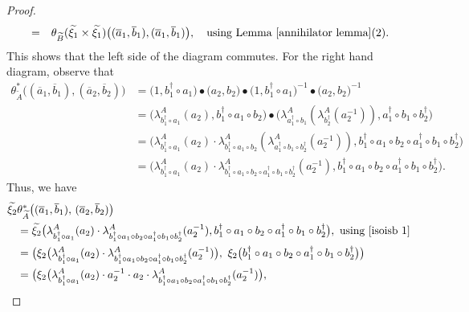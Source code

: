 \documentclass{jonasart}
\theoremstyle{plain}
\begin{document}
\begin{proof}
\begin{eqnarray*}
			&=&\theta_{\widetilde{B}}(\widetilde{\xi_1}\times\widetilde{\xi_1})\big((\overline{a}_1,\overline{b}_1 ),(\overline{a}_1,\overline{b}_1 )\big), \quad \text{using Lemma~\eqref{annihilator lemma}(2)}.
		\end{eqnarray*}
		This shows that the left side of the diagram commutes. For the right hand diagram, observe that
		\begin{align}
			\theta^*_{\widetilde{A}} \big((\overline{a}_1,\overline{b}_1 ), (\overline{a}_2,\overline{b}_2 ) \big)&= \big(1,b_1^\dagger\circ a_1\big) \bullet \big(a_2,b_2\big) \bullet\big(1,b_1^\dagger\circ a_1 \big)^{-1} \bullet \big(a_2,b_2 \big)^{-1}\nonumber\\
			&= \big(\lambda^A_{b_1^\dagger\circ a_1}(a_2 ), b_1^\dagger\circ a_1\circ b_2 \big) \bullet \big(\lambda^A_{a_1^\dagger\circ b_1}(\lambda^A_{b_2^\dagger}(a_2^{-1})), a_1^\dagger\circ b_1\circ b_2^\dagger \big)\nonumber\\
			&= \big(\lambda^A_{b_1^\dagger\circ a_1}(a_2 ) \cdot \lambda^A_{b_1^\dagger\circ a_1\circ b_2}(\lambda^A_{a_1^\dagger\circ b_1\circ b_2^\dagger}(a_2^{-1})), b_1^\dagger\circ a_1\circ b_2\circ a_1^\dagger\circ b_1 \circ b_2^\dagger \big)\nonumber\\
			&= \big(\lambda^A_{b_1^\dagger\circ a_1}(a_2 ) \cdot \lambda^A_{b_1^\dagger\circ a_1\circ b_2\circ a_1^\dagger\circ b_1 \circ b_2^\dagger}(a_2^{-1}), b_1^\dagger\circ a_1\circ b_2\circ a_1^\dagger\circ b_1 \circ b_2^\dagger \big).\label{isoisb 1}
		\end{align}
		Thus, we have
		\begin{align*}
			\widetilde{\xi_2}&\theta^*_{\widetilde{A}} \big((\overline{a}_1,\overline{b}_1 ), \, (\overline{a}_2,\overline{b}_2 ) \big)\\
			&=	\widetilde{\xi_2} \big(\lambda^A_{b_1^\dagger\circ a_1}(a_2 )\cdot \lambda^A_{b_1^\dagger\circ a_1\circ b_2\circ a_1^\dagger\circ b_1 \circ b_2^\dagger}(a_2^{-1}), b_1^\dagger\circ a_1\circ b_2\circ a_1^\dagger\circ b_1 \circ b_2^\dagger \big), \text{ using \eqref{isoisb 1}}\\
			&= \big(\xi_2 \big(\lambda^A_{b_1^\dagger\circ a_1}(a_2 ) \cdot \lambda^A_{b_1^\dagger\circ a_1\circ b_2\circ a_1^\dagger\circ b_1 \circ b_2^\dagger}(a_2^{-1})\big),~\xi_2\big(b_1^\dagger\circ a_1\circ b_2\circ a_1^\dagger\circ b_1 \circ b_2^\dagger \big) \big)\\
			&= \big(\xi_2 \big(\lambda^A_{b_1^\dagger\circ a_1}(a_2 )\cdot a_2^{-1}\cdot a_2 \cdot \lambda^A_{b_1^\dagger\circ a_1\circ b_2\circ a_1^\dagger\circ b_1 \circ b_2^\dagger}(a_2^{-1}) \big), \\

\end{align*}
\end{proof}
\end{document}
